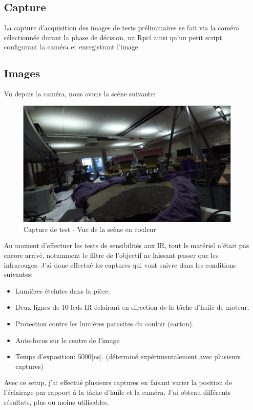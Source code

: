 \subsection{Capture}
La capture d'acquisition des images de tests préliminaires se fait via la caméra sélectionnée durant la phase de décision, un Rpi4 ainsi
qu'un petit script configurant la caméra et enregistrant l'image.
\subsection{Images}
Vu depuis la caméra, nous avons la scène suivante:

\begin{figure}[H]
    \centering
    \includegraphics[width=13cm]{assets/figures/camera_vue_couleur1.png}
    \caption{Capture de test - Vue de la scène en couleur}
\end{figure}

Au moment d'effectuer les tests de sensibilités aux IR, tout le matériel n'était pas encore arrivé, notamment le filtre de l'objectif ne
laissant passer que les infrarouges. J'ai donc effectué les captures qui vont suivre dans les conditions suivantes:
\begin{itemize}
    \item Lumières éteintes dans la pièce.
    \item Deux lignes de 10 leds IR éclairant en direction de la tâche d'huile de moteur.
    \item Protection contre les lumières parasites du couloir (carton).
    \item Auto-focus sur le centre de l'image
    \item Temps d'exposition: 5000[ns]. (déterminé expérimentalement avec plusieurs captures)
\end{itemize}
Avec ce setup, j'ai effectué plusieurs captures en faisant varier la position de l'éclairage par rapport à la tâche d'huile et la caméra.
J'ai obtenu différents résultats, plus ou moins utilisables.


